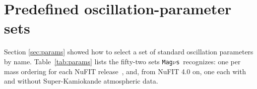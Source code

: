 \documentclass[final,5p,times,twocolumn,sort,compress]{elsarticle}
\makeatletter
\DeclareRobustCommand{\_}{%
  \ifmmode\nfss@text{\textunderscore}\else\textunderscore\allowbreak\fi}
\newcommand{\Tab}{Table}
\newcommand{\tabl}[1]{\Tab~\ref{tab:#1}}
\newcommand{\magnus}{{\tt Mag}\ensuremath{\nu}{\tt s}}
\makeatother
\begin{document}

\section{Predefined oscillation-parameter sets}
\label{app:params}
\appresetfloats

Section \ref{sec:params} showed how to select a set of standard oscillation parameters by name. \tabl{params} lists the fifty-two sets \magnus\ recognizes: one per mass ordering for each NuFIT release\ \cite{Gonzalez-Garcia:2012hef, Gonzalez-Garcia:2014bfa, Esteban:2016qun, Esteban:2018azc, Esteban:2020cvm, Esteban:2024eli, NuFIT61}, and, from NuFIT 4.0 on, one each with and without Super-Kamiokande atmospheric data.
\end{document}
